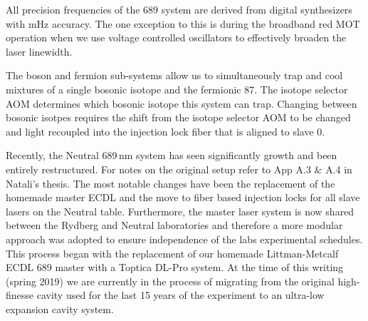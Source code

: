 All precision frequencies of the 689 system are derived from digital synthesizers with mHz accuracy.
The one exception to this is during the broadband red MOT operation when we use voltage controlled oscillators to effectively broaden the laser linewidth.

The boson and fermion sub-systems allow us to simultaneously trap and cool mixtures of a single bosonic isotope and the fermionic 87.
The isotope selector AOM determines which bosonic isotope this system can trap.
Changing between bosonic isotpes requires the shift from the isotope selector AOM to be changed and light recoupled into the injection lock fiber that is aligned to slave 0.

	
Recently, the Neutral 689\,nm system has seen significantly growth and been entirely restructured. 
For notes on the original setup refer to App A.3 \& A.4 in Natali's thesis.
The most notable changes have been the replacement of the homemade master ECDL and the move to fiber based injection locks for all slave lasers on the Neutral table.
Furthermore, the master laser system is now shared between the Rydberg and Neutral laboratories and therefore a more modular approach was adopted to ensure independence of the labs experimental schedules. 
This process began with the replacement of our homemade Littman-Metcalf ECDL 689 master with a Toptica DL-Pro system. At the time of this writing (spring 2019) we are currently in the process of migrating from the original high-finesse cavity used for the last 15 years \cite{Nagel2004} of the experiment to an ultra-low expansion cavity system. 

